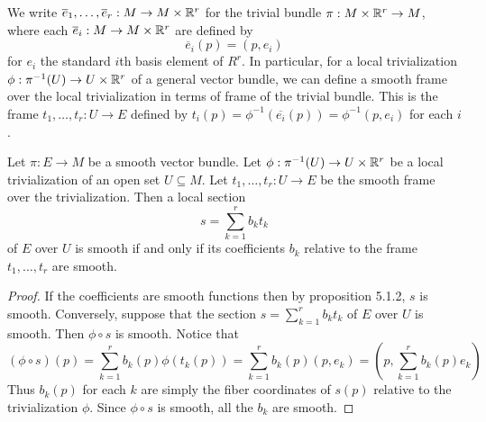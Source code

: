 \documentclass[a4paper]{article}
\begin{document}
We write $\overline{e}_1,\dots,\overline{e}_r:M\to M\times\mathbb{R}^r$ for the trivial bundle $\pi:M\times\mathbb{R}^r\to M$, where each $\overline{e}_i:M\to M\times\mathbb{R}^r$ are defined by $$\overline{e}_i(p)=(p,e_i)$$ for $e_i$ the standard $i$th basis element of $R^r$. In particular, for a local trivialization $\phi:\pi^{-1}(U)\to U\times\mathbb{R}^r$ of a general vector bundle, we can define a smooth frame over the local trivialization in terms of frame of the trivial bundle. This is the frame $t_1,\dots,t_r:U\to E$ defined by $t_i(p)=\phi^{-1}(\overline{e_i}(p))=\phi^{-1}(p,e_i)$ for each $i$. 

\begin{lmm}{}{} Let $\pi:E\to M$ be a smooth vector bundle. Let $\phi:\pi^{-1}(U)\to U\times\mathbb{R}^r$ be a local trivialization of an open set $U\subseteq M$. Let $t_1,\dots,t_r:U\to E$ be the smooth frame over the trivialization. Then a local section $$s=\sum_{k=1}^rb_kt_k$$ of $E$ over $U$ is smooth if and only if its coefficients $b_k$ relative to the frame $t_1,\dots,t_r$ are smooth. \tcbline
\begin{proof}
If the coefficients are smooth functions then by proposition 5.1.2, $s$ is smooth. Conversely, suppose that the section $s=\sum_{k=1}^rb_kt_k$ of $E$ over $U$ is smooth. Then $\phi\circ s$ is smooth. Notice that $$(\phi\circ s)(p)=\sum_{k=1}^rb_k(p)\phi(t_k(p))=\sum_{k=1}^rb_k(p)(p,e_k)=\left(p,\sum_{k=1}^rb_k(p)e_k\right)$$ Thus $b_k(p)$ for each $k$ are simply the fiber coordinates of $s(p)$ relative to the trivialization $\phi$. Since $\phi\circ s$ is smooth, all the $b_k$ are smooth. 
\end{proof}
\end{lmm}
\end{document}
